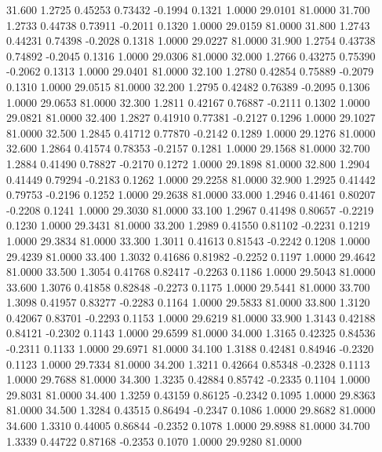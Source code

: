   31.600   1.2725   0.45253   0.73432  -0.1994   0.1321   1.0000  29.0101  81.0000
  31.700   1.2733   0.44738   0.73911  -0.2011   0.1320   1.0000  29.0159  81.0000
  31.800   1.2743   0.44231   0.74398  -0.2028   0.1318   1.0000  29.0227  81.0000
  31.900   1.2754   0.43738   0.74892  -0.2045   0.1316   1.0000  29.0306  81.0000
  32.000   1.2766   0.43275   0.75390  -0.2062   0.1313   1.0000  29.0401  81.0000
  32.100   1.2780   0.42854   0.75889  -0.2079   0.1310   1.0000  29.0515  81.0000
  32.200   1.2795   0.42482   0.76389  -0.2095   0.1306   1.0000  29.0653  81.0000
  32.300   1.2811   0.42167   0.76887  -0.2111   0.1302   1.0000  29.0821  81.0000
  32.400   1.2827   0.41910   0.77381  -0.2127   0.1296   1.0000  29.1027  81.0000
  32.500   1.2845   0.41712   0.77870  -0.2142   0.1289   1.0000  29.1276  81.0000
  32.600   1.2864   0.41574   0.78353  -0.2157   0.1281   1.0000  29.1568  81.0000
  32.700   1.2884   0.41490   0.78827  -0.2170   0.1272   1.0000  29.1898  81.0000
  32.800   1.2904   0.41449   0.79294  -0.2183   0.1262   1.0000  29.2258  81.0000
  32.900   1.2925   0.41442   0.79753  -0.2196   0.1252   1.0000  29.2638  81.0000
  33.000   1.2946   0.41461   0.80207  -0.2208   0.1241   1.0000  29.3030  81.0000
  33.100   1.2967   0.41498   0.80657  -0.2219   0.1230   1.0000  29.3431  81.0000
  33.200   1.2989   0.41550   0.81102  -0.2231   0.1219   1.0000  29.3834  81.0000
  33.300   1.3011   0.41613   0.81543  -0.2242   0.1208   1.0000  29.4239  81.0000
  33.400   1.3032   0.41686   0.81982  -0.2252   0.1197   1.0000  29.4642  81.0000
  33.500   1.3054   0.41768   0.82417  -0.2263   0.1186   1.0000  29.5043  81.0000
  33.600   1.3076   0.41858   0.82848  -0.2273   0.1175   1.0000  29.5441  81.0000
  33.700   1.3098   0.41957   0.83277  -0.2283   0.1164   1.0000  29.5833  81.0000
  33.800   1.3120   0.42067   0.83701  -0.2293   0.1153   1.0000  29.6219  81.0000
  33.900   1.3143   0.42188   0.84121  -0.2302   0.1143   1.0000  29.6599  81.0000
  34.000   1.3165   0.42325   0.84536  -0.2311   0.1133   1.0000  29.6971  81.0000
  34.100   1.3188   0.42481   0.84946  -0.2320   0.1123   1.0000  29.7334  81.0000
  34.200   1.3211   0.42664   0.85348  -0.2328   0.1113   1.0000  29.7688  81.0000
  34.300   1.3235   0.42884   0.85742  -0.2335   0.1104   1.0000  29.8031  81.0000
  34.400   1.3259   0.43159   0.86125  -0.2342   0.1095   1.0000  29.8363  81.0000
  34.500   1.3284   0.43515   0.86494  -0.2347   0.1086   1.0000  29.8682  81.0000
  34.600   1.3310   0.44005   0.86844  -0.2352   0.1078   1.0000  29.8988  81.0000
  34.700   1.3339   0.44722   0.87168  -0.2353   0.1070   1.0000  29.9280  81.0000
